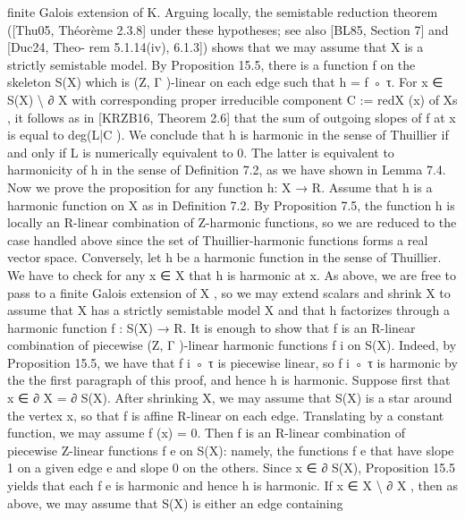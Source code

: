 \documentclass[
  10pt,
]{article}
\newenvironment{Shaded}{}{}
\newcommand{\NormalTok}[1]{#1}
\begin{document}
\begin{Shaded}
\begin{Highlighting}[]
\NormalTok{finite Galois extension of K. Arguing locally, the semistable reduction theorem ([Thu05,}
\NormalTok{Théorème 2.3.8] under these hypotheses; see also [BL85, Section 7] and [Duc24, Theo{-}}
\NormalTok{rem 5.1.14(iv), 6.1.3]) shows that we may assume that X is a strictly semistable model.}
\NormalTok{By Proposition 15.5, there is a function f on the skeleton S(X) which is (Z, Γ ){-}linear on}
\NormalTok{each edge such that h = f ◦ τ. For x ∈ S(X) \textbackslash{} ∂ X with corresponding proper irreducible}
\NormalTok{component C := redX (x) of Xs , it follows as in [KRZB16, Theorem 2.6] that the sum of}
\NormalTok{outgoing slopes of f at x is equal to deg(L|C ). We conclude that h is harmonic in the}
\NormalTok{sense of Thuillier if and only if L is numerically equivalent to 0. The latter is equivalent}
\NormalTok{to harmonicity of h in the sense of Definition 7.2, as we have shown in Lemma 7.4.}
\NormalTok{   Now we prove the proposition for any function h: X → R. Assume that h is a harmonic}
\NormalTok{function on X as in Definition 7.2. By Proposition 7.5, the function h is locally an R{-}linear}
\NormalTok{combination of Z{-}harmonic functions, so we are reduced to the case handled above since}
\NormalTok{the set of Thuillier{-}harmonic functions forms a real vector space.}
\NormalTok{   Conversely, let h be a harmonic function in the sense of Thuillier. We have to check}
\NormalTok{for any x ∈ X that h is harmonic at x. As above, we are free to pass to a finite Galois}
\NormalTok{extension of X , so we may extend scalars and shrink X to assume that X has a strictly}
\NormalTok{semistable model X and that h factorizes through a harmonic function f : S(X) → R. It}
\NormalTok{is enough to show that f is an R{-}linear combination of piecewise (Z, Γ ){-}linear harmonic}
\NormalTok{functions f i on S(X). Indeed, by Proposition 15.5, we have that f i ◦ τ is piecewise linear,}
\NormalTok{so f i ◦ τ is harmonic by the the first paragraph of this proof, and hence h is harmonic.}
\NormalTok{   Suppose first that x ∈ ∂ X = ∂ S(X). After shrinking X, we may assume that S(X)}
\NormalTok{is a star around the vertex x, so that f is affine R{-}linear on each edge. Translating by}
\NormalTok{a constant function, we may assume f (x) = 0. Then f is an R{-}linear combination of}
\NormalTok{piecewise Z{-}linear functions f e on S(X): namely, the functions f e that have slope 1 on a}
\NormalTok{given edge e and slope 0 on the others. Since x ∈ ∂ S(X), Proposition 15.5 yields that}
\NormalTok{each f e is harmonic and hence h is harmonic.}
\NormalTok{   If x ∈ X \textbackslash{} ∂ X , then as above, we may assume that S(X) is either an edge containing}

\end{Highlighting}
\end{Shaded}
\end{document}
